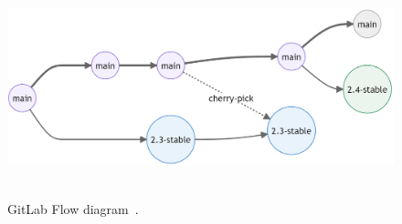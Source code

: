 ﻿\begin{figure}[H]
    \centering
    \includegraphics[width=1\textwidth]{img/GitLab_Flow}
    ~\caption{GitLab Flow diagram~\cite{GitLabFlow}.}\label{fig:gitlab-flow}
\end{figure}
